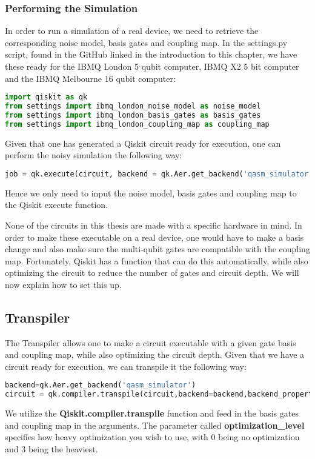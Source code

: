 \subsubsection{Performing the Simulation}
\label{subsubsec:NoisySimulation}
In order to run a simulation of a real device, we need to retrieve the corresponding noise model, basis gates and coupling map. In the settings.py script, found in the GitHub linked in the introduction to this chapter, we have these ready for the IBMQ London 5 qubit computer, IBMQ X2 5 bit computer and the IBMQ Melbourne 16 qubit computer:

\begin{lstlisting}[language=Python,numbers=none]
import qiskit as qk
from settings import ibmq_london_noise_model as noise_model
from settings import ibmq_london_basis_gates as basis_gates
from settings import ibmq_london_coupling_map as coupling_map
\end{lstlisting}

Given that one has generated a Qiskit circuit ready for execution, one can perform the noisy simulation the following way:

\begin{lstlisting}[language=Python,numbers=none]
job = qk.execute(circuit, backend = qk.Aer.get_backend('qasm_simulator'),shots=1000,noise_model=noise_model,basis_gates=basis_gates,coupling_map=coupling_map)
\end{lstlisting}
Hence we only need to input the noise model, basis gates and coupling map to the Qiskit execute function.

None of the circuits in this thesis are made with a specific hardware in mind. In order to make these executable on a real device, one would have to make a basis change and also make sure the multi-qubit gates are compatible with the coupling map. Fortunately, Qiskit has a function that can do this automatically, while also optimizing the circuit to reduce the number of gates and circuit depth. We will now explain how to set this up.

\subsection{Transpiler}
\label{subsec:QiskitTranspiler}
The Transpiler allows one to make a circuit executable with a given gate basis and coupling map, while also optimizing the circuit depth. Given that we have a circuit ready for execution, we can transpile it the following way:
\begin{lstlisting}[language=Python,numbers=none]
backend=qk.Aer.get_backend('qasm_simulator')
circuit = qk.compiler.transpile(circuit,backend=backend,backend_properties=backend.properties(),optimization_level=0,basis_gates=basis_gates,coupling_map=coupling_map)
\end{lstlisting}
We utilize the \textbf{Qiskit.compiler.transpile} function and feed in the basis gates and coupling map in the arguments. The parameter called \textbf{optimization\_level} specifies how heavy optimization you wish to use, with 0 being no optimization and 3 being the heaviest.

